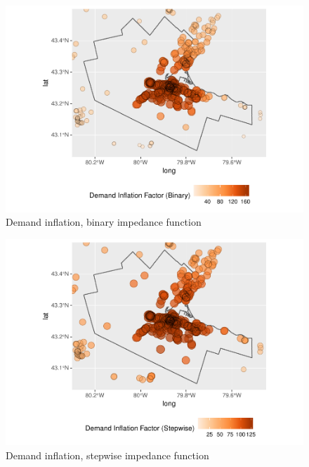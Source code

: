 \documentclass[10pt,letterpaper]{article}
\begin{document}
\begin{figure}
\includegraphics[width=0.95\linewidth]{Supply_and_Demand_Inflation_in_FCA_Methods_v2.0_files/figure-latex/fig10-map-demand-inflation-binary-1} \caption{\label{fig:fig10-map-demand-inflation-binary}Demand inflation, binary impedance function}\label{fig:fig10-map-demand-inflation-binary}
\end{figure}

\begin{figure}
\includegraphics[width=0.95\linewidth]{Supply_and_Demand_Inflation_in_FCA_Methods_v2.0_files/figure-latex/fig11-map-demand-inflation-stepwise-1} \caption{\label{fig:fig11-map-demand-inflation-stepwise}Demand inflation, stepwise impedance function}\label{fig:fig11-map-demand-inflation-stepwise}
\end{figure}
\end{document}
